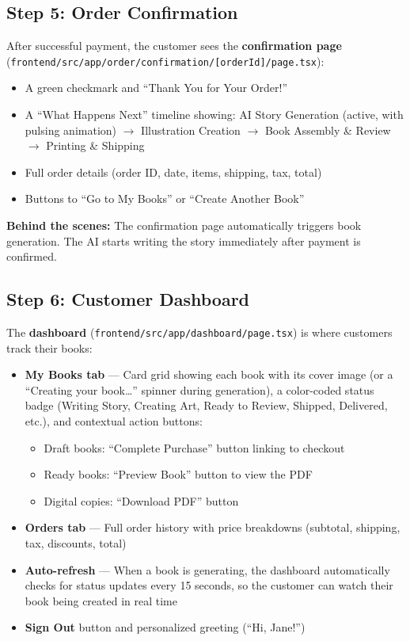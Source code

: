 \documentclass[12pt, letterpaper, oneside]{book}
\begin{document}
\subsection*{Step 5: Order Confirmation}
After successful payment, the customer sees the \textbf{confirmation page} (\texttt{frontend/src/app/order/confirmation/[orderId]/page.tsx}):
\begin{itemize}[leftmargin=2em]
  \item A green checkmark and ``Thank You for Your Order!''
  \item A ``What Happens Next'' timeline showing: AI Story Generation (active, with pulsing animation) $\rightarrow$ Illustration Creation $\rightarrow$ Book Assembly \& Review $\rightarrow$ Printing \& Shipping
  \item Full order details (order ID, date, items, shipping, tax, total)
  \item Buttons to ``Go to My Books'' or ``Create Another Book''
\end{itemize}

\textbf{Behind the scenes:} The confirmation page automatically triggers book generation. The AI starts writing the story immediately after payment is confirmed.

\subsection*{Step 6: Customer Dashboard}
The \textbf{dashboard} (\texttt{frontend/src/app/dashboard/page.tsx}) is where customers track their books:
\begin{itemize}[leftmargin=2em]
  \item \textbf{My Books tab} --- Card grid showing each book with its cover image (or a ``Creating your book\ldots'' spinner during generation), a color-coded status badge (Writing Story, Creating Art, Ready to Review, Shipped, Delivered, etc.), and contextual action buttons:
    \begin{itemize}[leftmargin=1.5em]
      \item Draft books: ``Complete Purchase'' button linking to checkout
      \item Ready books: ``Preview Book'' button to view the PDF
      \item Digital copies: ``Download PDF'' button
    \end{itemize}
  \item \textbf{Orders tab} --- Full order history with price breakdowns (subtotal, shipping, tax, discounts, total)
  \item \textbf{Auto-refresh} --- When a book is generating, the dashboard automatically checks for status updates every 15 seconds, so the customer can watch their book being created in real time
  \item \textbf{Sign Out} button and personalized greeting (``Hi, Jane!'')
\end{itemize}
\end{document}
